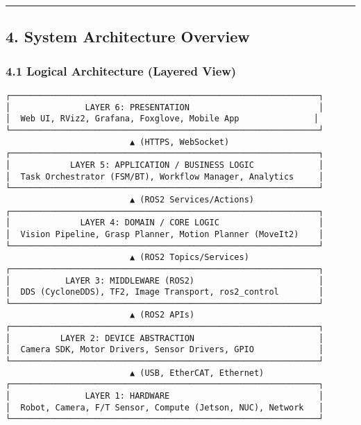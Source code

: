 \documentclass[
]{article}
\begin{document}
\begin{center}\rule{0.5\linewidth}{0.5pt}\end{center}

\hypertarget{system-architecture-overview}{%
\subsection{4. System Architecture
Overview}\label{system-architecture-overview}}

\hypertarget{logical-architecture-layered-view}{%
\subsubsection{4.1 Logical Architecture (Layered
View)}\label{logical-architecture-layered-view}}

\begin{verbatim}
┌──────────────────────────────────────────────────────────────┐
│               LAYER 6: PRESENTATION                          │
│  Web UI, RViz2, Grafana, Foxglove, Mobile App               │
└──────────────────────────────────────────────────────────────┘
                         ▲ (HTTPS, WebSocket)
┌──────────────────────────────────────────────────────────────┐
│            LAYER 5: APPLICATION / BUSINESS LOGIC             │
│  Task Orchestrator (FSM/BT), Workflow Manager, Analytics     │
└──────────────────────────────────────────────────────────────┘
                         ▲ (ROS2 Services/Actions)
┌──────────────────────────────────────────────────────────────┐
│              LAYER 4: DOMAIN / CORE LOGIC                    │
│  Vision Pipeline, Grasp Planner, Motion Planner (MoveIt2)    │
└──────────────────────────────────────────────────────────────┘
                         ▲ (ROS2 Topics/Services)
┌──────────────────────────────────────────────────────────────┐
│           LAYER 3: MIDDLEWARE (ROS2)                         │
│  DDS (CycloneDDS), TF2, Image Transport, ros2_control        │
└──────────────────────────────────────────────────────────────┘
                         ▲ (ROS2 APIs)
┌──────────────────────────────────────────────────────────────┐
│          LAYER 2: DEVICE ABSTRACTION                         │
│  Camera SDK, Motor Drivers, Sensor Drivers, GPIO             │
└──────────────────────────────────────────────────────────────┘
                         ▲ (USB, EtherCAT, Ethernet)
┌──────────────────────────────────────────────────────────────┐
│               LAYER 1: HARDWARE                              │
│  Robot, Camera, F/T Sensor, Compute (Jetson, NUC), Network   │
└──────────────────────────────────────────────────────────────┘
\end{verbatim}
\end{document}
